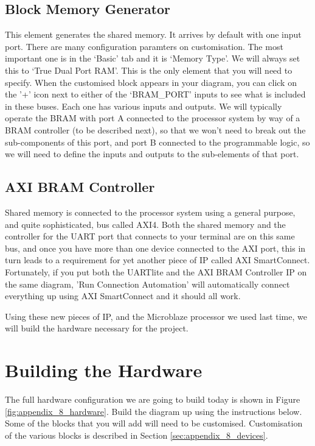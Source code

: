 \documentclass[../physical_computing.tex]{subfiles}
\begin{document}
\subsection{Block Memory Generator}
\label{sec:appendix_8_block_memory}

This element generates the shared memory. It arrives by default with one input port. There are many configuration paramters on customisation. The most important one is in the `Basic' tab and it is `Memory Type'. We will always set this to `True Dual Port RAM'. This is the only element that you will need to specify. When the customised block appears in your diagram, you can click on the '+' icon next to either of the `BRAM\_PORT' inputs to see what is included in these buses. Each one has various inputs and outputs. We will typically operate the BRAM with port A connected to the processor system by way of a BRAM controller (to be described next), so that we won't need to break out the sub-components of this port, and port B connected to the programmable logic, so we will need to define the inputs and outputs to the sub-elements of that port.

\subsection{AXI BRAM Controller}
\label{sec:appendix_8_bram_controller}

Shared memory is connected to the processor system using a general purpose, and quite sophisticated, bus called AXI4. Both the shared memory and the controller for the UART port that connects to your terminal are on this same bus, and once you have more than one device connected to the AXI port, this in turn leads to a requirement for yet another piece of IP called AXI SmartConnect. Fortunately, if you put both the UARTlite and the AXI BRAM Controller IP on the same diagram, 'Run Connection Automation' will automatically connect everything up using AXI SmartConnect and it should all work. 

Using these new pieces of IP, and the Microblaze processor we used last time, we will build the hardware necessary for the project.

\section{Building the Hardware}
\label{sec:appendix_8_hardware}

The full hardware configuration we are going to build today is shown in Figure \ref{fig:appendix_8_hardware}. Build the diagram up using the instructions below. Some of the blocks that you will add will need to be customised. Customisation of the various blocks is described in Section \ref{sec:appendix_8_devices}.
\end{document}
